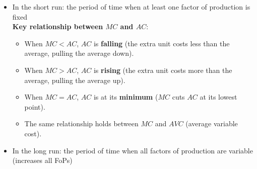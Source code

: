 \begin{itemize}
  \item In the short run: the period of time when at least one factor of production is fixed\\
  \textbf{Key relationship between $MC$ and $AC$}:
\begin{itemize}
  \item When $MC < AC$, $AC$ is \textbf{falling} (the extra unit costs less than the average, pulling the average down).
  \item When $MC > AC$, $AC$ is \textbf{rising} (the extra unit costs more than the average, pulling the average up).
  \item When $MC = AC$, $AC$ is at its \textbf{minimum} ($MC$ cuts $AC$ at its lowest point).
  \item The same relationship holds between $MC$ and $AVC$ (average variable cost).
\end{itemize}
 
\begin{center}
\end{center}
 \item In the long run: the period of time when all factors of production are variable (increases all FoPs)
\end{itemize}

